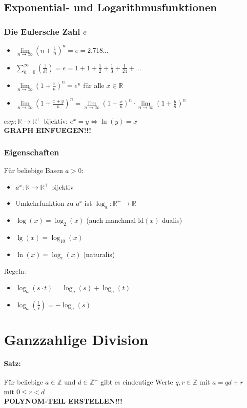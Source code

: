 \subsection{Exponential- und Logarithmusfunktionen}
\subsubsection{Die Eulersche Zahl $e$}
\begin{itemize}
\item $\lim\limits_{n \to \infty}\left(n+\frac{1}{n}\right)^n=e=2.718\ldots$
\item $\sum\limits_{k=0}^{\infty}\left(\frac{1}{k!}\right)=e=1+1+\frac{1}{2}+\frac{1}{3}+\frac{1}{24}+\ldots$
\item $\lim\limits_{n\to\infty}\left(1+\frac{x}{n}\right)^n=e^n$ für alle $x\in\mathbb{R}$
\item $\lim\limits_{n\to\infty}\left(1+\frac{x+y}{n}\right)^n=\lim\limits_{n\to\infty}\left(1+\frac{x}{n}\right)^n \cdot \lim\limits_{n\to\infty}\left(1+\frac{y}{n}\right)^n$
\end{itemize}
$exp: \mathbb{R}\to	\mathbb{R}^+$ bijektiv:
$e^x=y \Leftrightarrow \ln(y)=x$\\
\textbf{GRAPH EINFUEGEN!!!}

\subsubsection{Eigenschaften}
Für beliebige Basen $a>0$:
\begin{itemize}
\item $a^x:\mathbb{R}\to\mathbb{R}^+$ bijektiv
\item Umkehrfunktion zu $a^x$ ist $\log_a:\mathbb{R}^+\to\mathbb{R}$
\item $\log(x)=\log_2(x)$ (auch manchmal $\text{ld}(x)$ \glq dualis\grq )
\item $\lg(x)=\log_{10}(x)$
\item $\ln(x)=\log_e(x)$ (\glq naturalis\grq )
\end{itemize}
Regeln:
\begin{itemize}
\item $\log_a(s\cdot t) = \log_a(s) + \log_a(t)$
\item $\log_a\left(\frac{1}{s}\right)=-\log_a(s)$
\end{itemize}

\section{Ganzzahlige Division}
\paragraph{Satz:}Für beliebige $a\in\mathbb{Z}$ und $d\in\mathbb{Z}^+$ gibt es eindeutige Werte $q,r\in\mathbb{Z}$ mit $a=qd+r$ mit $0\leq r<d$
\\ \textbf{POLYNOM-TEIL ERSTELLEN!!!}
%